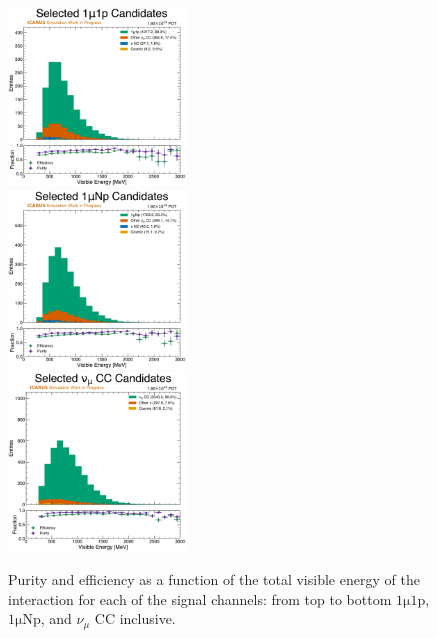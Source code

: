 \begin{figure}[!htb]
    \centering
    \includegraphics[width=0.42\textwidth]{figures/neutrino_selection/selected_hist1d_1mu1p_visible_energy.pdf}\\
    \includegraphics[width=0.42\textwidth]{figures/neutrino_selection/selected_hist1d_1muNp_visible_energy.pdf}\\
    \includegraphics[width=0.42\textwidth]{figures/neutrino_selection/selected_hist1d_1muX_visible_energy.pdf}\\
    \caption{Purity and efficiency as a function of the total visible energy of the interaction for each of the signal channels: from top to bottom $\mathrm{1\mu 1p}$, $\mathrm{1\mu Np}$, and $\nu_\mu$ CC inclusive.}
    \label{fig:pureff_visible_energy}
\end{figure}

